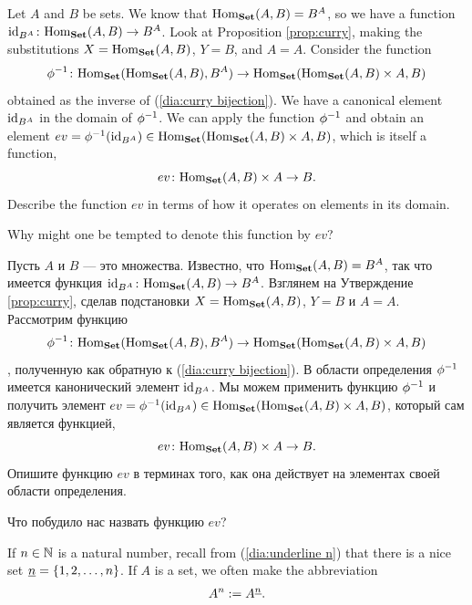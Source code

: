 \documentclass[CT4S-EN-RU]{subfiles}
\begin{document}
\begin{exerciseENG}\label{exc:evaluation}
Let $A$ and $B$ be sets. We know that $\textnormal{Hom}_{\bf Set}(A,B)=B^A$, so we have a function $\textnormal{id}_{B^A}\colon\textnormal{Hom}_{\bf Set}(A,B)\rightarrow B^A$. Look at Proposition \ref{prop:curry}, making the substitutions $X=\textnormal{Hom}_{\bf Set}(A,B)$, $Y=B$, and  $A=A$. Consider the function $$\phi^\m1\taking\Hom_\Set(\Hom_\Set(A,B),B^A)\to\Hom_\Set(\Hom_\Set(A,B)\times A,B)$$ obtained as the inverse of (\ref{dia:curry bijection}). We have a canonical element $\textnormal{id}_{B^A}$ in the domain of $\phi^\m1$. We can apply the function $\phi^\m1$ and obtain an element $ev=\phi^\m1(\id_{B^A})\in\Hom_\Set(\Hom_\Set(A,B)\times A,B)$, which is itself a function, $$ev\colon\textnormal{Hom}_{\bf Set}(A,B)\times A\rightarrow B.$$ 
\sexc Describe the function $ev$ in terms of how it operates on elements in its domain. 
\item Why might one be tempted to denote this function by $ev$?
\endsexc
\end{exerciseENG}

\begin{exerciseRUS}\label{exc:evaluation}
Пусть $A$ и $B$ — это множества. Известно, что $\textnormal{Hom}_{\bf Set}(A,B)=B^A$, так что имеется функция $\textnormal{id}_{B^A}\colon\textnormal{Hom}_{\bf Set}(A,B)\rightarrow B^A$. Взглянем на Утверждение \ref{prop:curry}, сделав подстановки $X=\textnormal{Hom}_{\bf Set}(A,B)$, $Y=B$ и  $A=A$. Рассмотрим функцию $$\phi^\m1\taking\Hom_\Set(\Hom_\Set(A,B),B^A)\to\Hom_\Set(\Hom_\Set(A,B)\times A,B)$$, полученную как обратную к (\ref{dia:curry bijection}). В области определения $\phi^\m1$ имеется канонический элемент $\textnormal{id}_{B^A}$. Мы можем применить функцию $\phi^\m1$ и получить элемент $ev=\phi^\m1(\id_{B^A})\in\Hom_\Set(\Hom_\Set(A,B)\times A,B)$, который сам является функцией, $$ev\colon\textnormal{Hom}_{\bf Set}(A,B)\times A\rightarrow B.$$ 
\sexc Опишите функцию $ev$ в терминах того, как она действует на элементах своей области определения. 
\item Что побудило нас назвать функцию $ev$?%
\endsexc
\end{exerciseRUS}

\begin{blockENG}
If $n\in{\mathbb N}$ is a natural number, recall from (\ref{dia:underline n}) that there is a nice set $\underline{n}=\{1,2,\ldots,n\}$. If $A$ is a set, we often make the abbreviation 
\begin{align}\label{dia:exponential abbrev}
A^n:=A^{\underline{n}}.
\end{align}
\end{blockENG}
\end{document}
